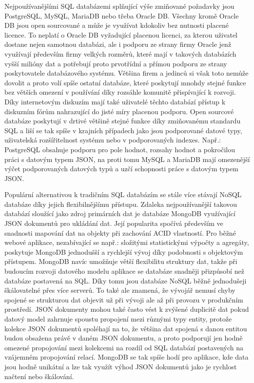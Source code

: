 		Nejpoužívanějšími \Ac{SQL} databázemi splňující výše zmiňované požadavky jsou PostgreSQL, MySQL, MariaDB
		nebo třeba Oracle DB.
		Všechny kromě Oracle DB jsou open sourcované a může je využívat kdokoliv bez nutnosti placené licence.
		To neplatí o Oracle DB vyžadující placenou licenci, za kterou uživatel dostane nejen samotnou databázi, ale
		i podporu ze strany firmy Oracle jenž využívají především firmy velkých rozměrů, které mají v takových databázích
		vyšší milióny dat a potřebují proto prvotřídní a přímou podporu ze strany poskytovatele databázového systému.
		Většina firem a jedinců si však toto nemůže dovolit a proto volí spíše ostatní databáze, které poskytují mnohdy
		stejné funkce bez větších omezení v používání díky rozsáhle komunitě přispívající k rozvoji.
		Díky internetovým diskuzím mají také uživatelé těchto databází přístup k diskuzním fórům nahrazující do jisté míry
		placenou podporu.
		Open sourcové databáze poskytují v drtivé většině stejné funkce díky zmiňovanému standardu \Ac{SQL} a
		liší se tak spíše v krajních případech jako jsou podporované datové typy, uživatelská rozšířitelnost systému
		nebo v podporovaných indexes.
		Např.: PostgreSQL obsahuje podporu pro pole hodnot, rozsahy hodnot a pokročilou práci s datovým typem \Ac{JSON},
		na proti tomu MySQL a MariaDB mají omezenější výčet podporovaných datových typů a uzčí schopnosti práce s datovým
		typem \Ac{JSON}.

		Populární alternativou k tradičním \Ac{SQL} databázím se stále více stávají \Ac{NoSQL} databáze
		díky jejich flexibilnějšímu přístupu.
		Zdaleka nejpoužívanější takovou databází sloužící jako zdroj primárních dat je databáze MongoDB využívající
		\Ac{JSON} dokumentů pro ukládání dat.
		Její popularita spočívá především ve snadnosti mapování dat na objekty při zachování \Ac{ACID} vlastností.
		Pro běžné webové aplikace, nezabívající se např.: složitými statistickými výpočty a agregáty, poskytuje MongoDB
		jednodušší a rychlejší vývoj díky podobnosti s objektovým přístupem.
		MongoDB navíc umožňuje větší flexibilitu struktury dat, takže při budoucím rozvoji datového modelu aplikace se
		databáze snadněji přizpůsobí než databáze postavená na \Ac{SQL}.
		Díky tomu jsou databáze \Ac{NoSQL} běžně jednodušeji škálovatelné přes více serverů.\cite{when_to_use_nosql}
		To také ale znamená, že vývojář nemusí chyby spojené se strukturou dat objevit už při vývoji ale až při provozu
		v produkčním prostředí.
		\Ac{JSON} dokumenty mohou také často vést k zvýšené duplicitě dat pokud datový model zahrnuje spoustu
		propojení mezi různými typy entity, protože kolekce \Ac{JSON} dokumentů spoléhají na to, že většina dat
		spojená s danou entitou budou obsažena právě v daném \Ac{JSON} dokumentu, a proto podporují jen hodně
		omezené propojování mezi kolekcemi na rozdíl od \Ac{SQL} databází postavených na vzájemném propojování
		relací.
		MongoDB se tak spíše hodí pro aplikace, kde data jsou hodně unikátní a lze tak využít výhod \Ac{JSON}
		dokumentů jako je rychlost načtení nebo škálování.\cite{why_you_should_never_use_mongodb}

